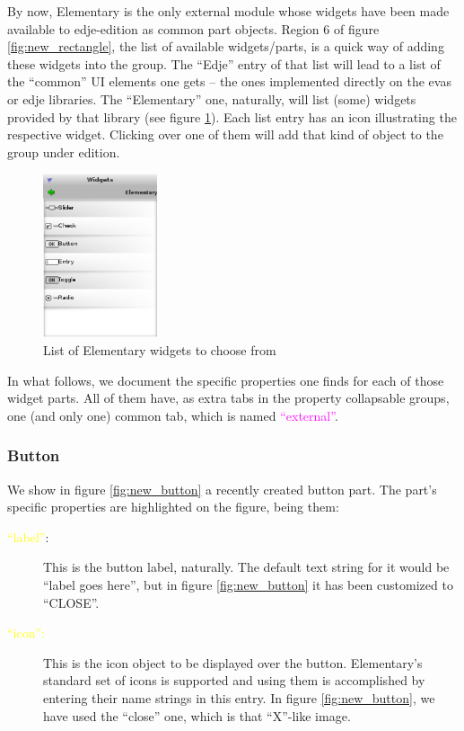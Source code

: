 \documentclass[a4paper]{profusion}
\newcommand{\GUILabel}[1]{\textcolor{magenta}{#1}}
\newcommand{\GUIEditable}[1]{\textcolor{yellow}{#1}} %
\begin{document}
By now, Elementary is the only external module whose widgets have been
made available to edje-edition as common part objects. Region 6 of
figure \ref{fig:new_rectangle}, the list of available widgets/parts,
is a quick way of adding these widgets into the group. The ``Edje''
entry of that list will lead to a list of the ``common'' UI elements
one gets -- the ones implemented directly on the evas or edje
libraries. The ``Elementary'' one, naturally, will list (some) widgets
provided by that library (see figure \ref{fig:elm_widgets}). Each list
entry has an icon illustrating the respective widget. Clicking over
one of them will add that kind of object to the group under edition.

\begin{figure}[h!]
  \centering
  \includegraphics[width=0.3\textwidth]{images/elm_widgets.png}
  \caption{List of Elementary widgets to choose from}
  \label{fig:elm_widgets}
\end{figure}

In what follows, we document the specific properties one finds for
each of those widget parts. All of them have, as extra tabs in the
property collapsable groups, one (and only one) common tab, which is
named \GUILabel{``external''}.

\subsubsection{Button}

We show in figure \ref{fig:new_button} a recently created button part.
The part's specific properties are highlighted on the figure, being
them:

\begin{description}
  \item[\GUIEditable{``label''}:] This is the button label,
    naturally. The default text string for it would be ``label goes
    here'', but in figure \ref{fig:new_button} it has been customized
    to ``CLOSE''.
  \item[\GUIEditable{``icon'':}] This is the icon object to be
    displayed over the button. Elementary's standard set of icons is
    supported and using them is accomplished by entering their name
    strings in this entry. In figure \ref{fig:new_button}, we have
    used the ``close'' one, which is that ``X''-like image.
\end{description}
\end{document}
